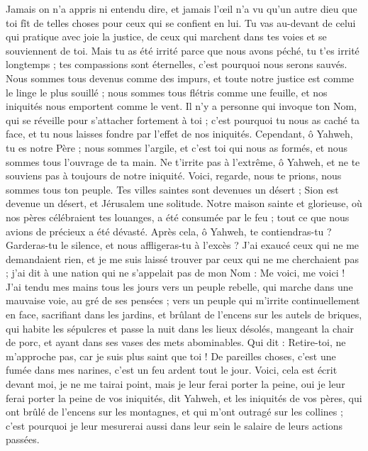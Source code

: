 \begin{multicols}{2}
Jamais on n'a appris ni entendu dire, et jamais l'œil n'a vu qu'un autre dieu que toi fît de telles choses pour ceux qui se confient en lui.
Tu vas au-devant de celui qui pratique avec joie la justice, de ceux qui marchent dans tes voies et se souviennent de toi. Mais tu as été irrité parce que nous avons péché, tu t'es irrité longtemps ; tes compassions sont éternelles, c'est pourquoi nous serons sauvés.
Nous sommes tous devenus comme des impurs, et toute notre justice est comme le linge le plus souillé ; nous sommes tous flétris comme une feuille, et nos iniquités nous emportent comme le vent.
Il n'y a personne qui invoque ton Nom, qui se réveille pour s'attacher fortement à toi ; c'est pourquoi tu nous as caché ta face, et tu nous laisses fondre par l'effet de nos iniquités.
Cependant, ô Yahweh, tu es notre Père ; nous sommes l'argile, et c'est toi qui nous as formés, et nous sommes tous l'ouvrage de ta main.
Ne t'irrite pas à l'extrême, ô Yahweh, et ne te souviens pas à toujours de notre iniquité. Voici, regarde, nous te prions, nous sommes tous ton peuple.
Tes villes saintes sont devenues un désert ; Sion est devenue un désert, et Jérusalem une solitude.
Notre maison sainte et glorieuse, où nos pères célébraient tes louanges, a été consumée par le feu ; tout ce que nous avions de précieux a été dévasté.
Après cela, ô Yahweh, te contiendras-tu ? Garderas-tu le silence, et nous affligeras-tu à l'excès ?
\VerseOne{}J'ai exaucé ceux qui ne me demandaient rien, et je me suis laissé trouver par ceux qui ne me cherchaient pas ; j'ai dit à une nation qui ne s'appelait pas de mon Nom : Me voici, me voici !
J'ai tendu mes mains tous les jours vers un peuple rebelle, qui marche dans une mauvaise voie, au gré de ses pensées ;
vers un peuple qui m'irrite continuellement en face, sacrifiant dans les jardins, et brûlant de l'encens sur les autels de briques,
qui habite les sépulcres et passe la nuit dans les lieux désolés, mangeant la chair de porc, et ayant dans ses vases des mets abominables.
Qui dit : Retire-toi, ne m'approche pas, car je suis plus saint que toi ! De pareilles choses, c'est une fumée dans mes narines, c'est un feu ardent tout le jour.
Voici, cela est écrit devant moi, je ne me tairai point, mais je leur ferai porter la peine, oui je leur ferai porter la peine
de vos iniquités, dit Yahweh, et les iniquités de vos pères, qui ont brûlé de l'encens sur les montagnes, et qui m'ont outragé sur les collines ; c'est pourquoi je leur mesurerai aussi dans leur sein le salaire de leurs actions passées.

\end{multicols}
